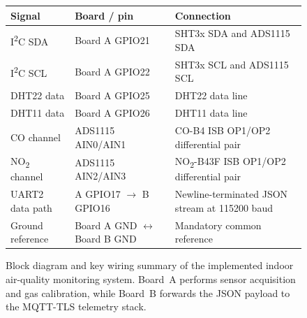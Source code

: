 \documentclass[conference]{IEEEtran}
\begin{document}
\begin{figure}[t]
{
}

\vspace{0.8em}

\scriptsize
\begin{tabular}{@{}p{}p{}p{}@{}}
\toprule
Signal & Board / pin & Connection \\
\midrule
I\textsuperscript{2}C SDA & Board A GPIO21 & SHT3x SDA and ADS1115 SDA \\
I\textsuperscript{2}C SCL & Board A GPIO22 & SHT3x SCL and ADS1115 SCL \\
DHT22 data & Board A GPIO25 & DHT22 data line \\
DHT11 data & Board A GPIO26 & DHT11 data line \\
CO channel & ADS1115 AIN0/AIN1 & CO-B4 ISB OP1/OP2 differential pair \\
NO\textsubscript{2} channel & ADS1115 AIN2/AIN3 & NO\textsubscript{2}-B43F ISB OP1/OP2 differential pair \\
UART2 data path & A GPIO17 $\rightarrow$ B GPIO16 & Newline-terminated JSON stream at 115200 baud \\
Ground reference & Board A GND $\leftrightarrow$ Board B GND & Mandatory common reference \\
\bottomrule
\end{tabular}

\caption{Block diagram and key wiring summary of the implemented indoor air-quality monitoring system. Board~A performs sensor acquisition and gas calibration, while Board~B forwards the JSON payload to the MQTT-TLS telemetry stack.}
\label{fig:block_diagram}
\end{figure}
\end{document}

